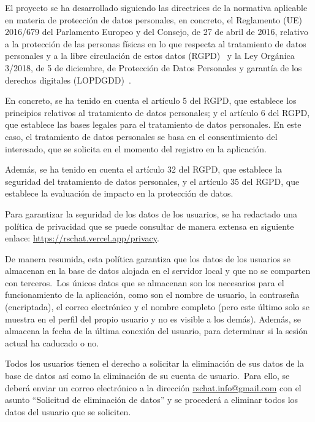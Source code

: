 El proyecto se ha desarrollado siguiendo las directrices de la normativa aplicable en materia de protección de datos
personales, en concreto, el Reglamento (UE) 2016/679 del Parlamento
Europeo y del Consejo, de 27 de abril de 2016, relativo a la protección de las personas físicas en lo que respecta al
tratamiento de datos personales y a la libre circulación de estos datos (RGPD)~\cite{REGLAMEN74:online} y la
Ley Orgánica 3/2018, de 5 de diciembre, de Protección
de Datos Personales y garantía de los derechos digitales (LOPDGDD)~\cite{BOEA20187-LOPDGDD}.

En concreto, se ha tenido en cuenta el artículo 5 del RGPD, que establece los principios relativos al tratamiento de
datos personales; y el artículo 6 del RGPD, que establece las bases legales para el tratamiento de datos personales.
En este caso, el tratamiento de datos personales se basa en el consentimiento del interesado, que se solicita en el
momento del registro en la aplicación.

Además, se ha tenido en cuenta el artículo 32 del RGPD, que establece la
seguridad del tratamiento de datos personales, y el artículo 35 del RGPD, que establece la evaluación de impacto en la
protección de datos.


Para garantizar la seguridad de los datos de los usuarios, se ha redactado una política de privacidad
que se puede consultar de manera extensa en siguiente enlace:
\href{https://rschat.vercel.app/privacy}{https://rschat.vercel.app/privacy}.

De manera resumida, esta política garantiza que los datos de los usuarios se almacenan en la base de datos alojada en el
servidor local y que no se comparten con terceros.\ Los únicos datos que se almacenan son los necesarios para el
funcionamiento de la aplicación, como son el nombre de usuario, la contraseña (encriptada), el correo electrónico y
el nombre completo (pero este último solo se muestra en el perfil del propio usuario y no es visible a los demás).
Además, se almacena la fecha de la última conexión del usuario, para determinar si la sesión actual ha caducado o no.

Todos los usuarios tienen el derecho a solicitar la eliminación de sus datos de la base de datos así como
la eliminación de su cuenta de usuario.\ Para ello, se deberá enviar un correo electrónico a la dirección
\href{mailto:rschat.info@gmail.com}{rschat.info@gmail.com} con el asunto ``Solicitud de eliminación de datos'' y se
procederá a eliminar todos los datos del usuario que se soliciten.
